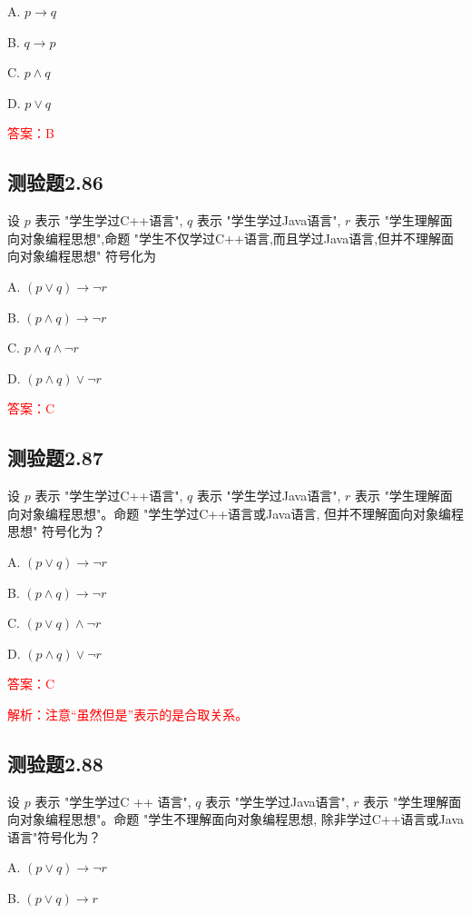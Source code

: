 \documentclass[UTF8, heading=true]{ctexart}
\begin{document}
A. $
p \rightarrow q
$

B. $
q \rightarrow p
$

C. $
p \wedge q
$

D. $
p \vee q
$

\textcolor{red}{答案：B}

\subsection{测验题2.86}

设 $p$ 表示 "学生学过C++语言", $q$ 表示 "学生学过Java语言", $r$ 表示 "学生理解面向对象编程思想",命题 "学生不仅学过C++语言,而且学过Java语言,但并不理解面向对象编程思想" 符号化为

A. $
(p \vee q) \rightarrow \neg r
$

B. $
(p \wedge q) \rightarrow \neg r
$

C. $
p \wedge q \wedge \neg r
$

D. $
(p \wedge q) \vee \neg r
$

\textcolor{red}{答案：C}



\subsection{测验题2.87}

设 $p$ 表示 "学生学过C++语言", $q$ 表示 "学生学过Java语言", $r$ 
表示 "学生理解面向对象编程思想"。命题 "学生学过C++语言或Java语言, 
但并不理解面向对象编程思想" 符号化为？

A. $(p \vee q) \rightarrow \neg r$

B. $(p \wedge q) \rightarrow \neg r$

C. $(p \vee q) \wedge \neg r$

D. $(p \wedge q) \vee \neg r$

\textcolor{red}{答案：C}

\textcolor{red}{解析：注意“虽然但是”表示的是合取关系。}

\subsection{测验题2.88}

设 $p$ 表示 "学生学过C ++ 语言", $q$ 表示 "学生学过Java语言", $r$ 表示 
"学生理解面向对象编程思想"。命题 "学生不理解面向对象编程思想,
除非学过C++语言或Java语言"符号化为？

A. $
(p \vee q) \rightarrow \neg r
$

B. $
(p \vee q) \rightarrow r
$
\end{document}
